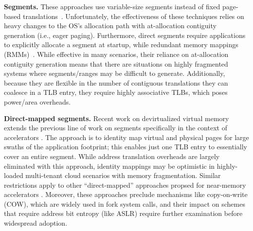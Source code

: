 \vspace{2mm}
\noindent\textbf{Segments.} These approaches use variable-size
segments instead of fixed page-based
translations~\cite{karakostas:redundant, park:hybrid,
  basu:efficient}. Unfortunately, the effectiveness of these
techniques relies on heavy changes to the OS's allocation path with
at-allocation contiguity generation (i.e., eager paging). Furthermore,
direct segments require applications to explicitly allocate a segment
at startup, while redundant memory mappings
(RMMs)~\cite{karakostas:redundant}. While effective in many scenarios,
their reliance on at-allocation contiguity generation means that there
are situations on highly fragmented systems where segments/ranges may
be difficult to generate. Additionally, because they are flexible in
the number of contiguous translations they can coalesce in a TLB
entry, they require highly associative TLBs, which poses power/area
overheads.

\vspace{2mm}
\noindent\textbf{Direct-mapped segments.} Recent work on devirtualized
virtual memory extends the previous line of work on segments
specifically in the context of accelerators
\cite{haria:devirtualizing}. The approach is to identity map virtual
and physical pages for large swaths of the application footprint; this
enables just one TLB entry to essentially cover an entire
segment. While address translation overheads are largely eliminated
with this approach, identity mappings may be optimistic in
highly-loaded multi-tenant cloud scenarios with memory
fragmentation. Similar restrictions apply to other ``direct-mapped''
approaches propsed for near-memory accelerators
\cite{picorel:near-memory}. Moreover, these approaches preclude
mechanisms like copy-on-write (COW), which are widely used in fork
system calls, and their impact on schemes that require address bit
entropy (like ASLR) require further examination before widespread
adoption.



